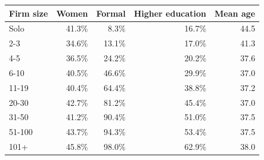 \begin{tabular}{lrrrr}
\toprule
    Firm size & Women & Formal & Higher education & Mean age \\
    \midrule
Solo & 41.3\% & 8.3\% & 16.7\% & 44.5 \\
2-3 & 34.6\% & 13.1\% & 17.0\% & 41.3 \\
4-5 & 36.5\% & 24.2\% & 20.2\% & 37.6 \\
6-10 & 40.5\% & 46.6\% & 29.9\% & 37.0 \\
11-19 & 40.4\% & 64.4\% & 38.8\% & 37.2 \\
20-30 & 42.7\% & 81.2\% & 45.4\% & 37.0 \\
31-50 & 41.2\% & 90.4\% & 51.0\% & 37.5 \\
51-100 & 43.7\% & 94.3\% & 53.4\% & 37.5 \\
101+ & 45.8\% & 98.0\% & 62.9\% & 38.0\\
\bottomrule\end{tabular}
